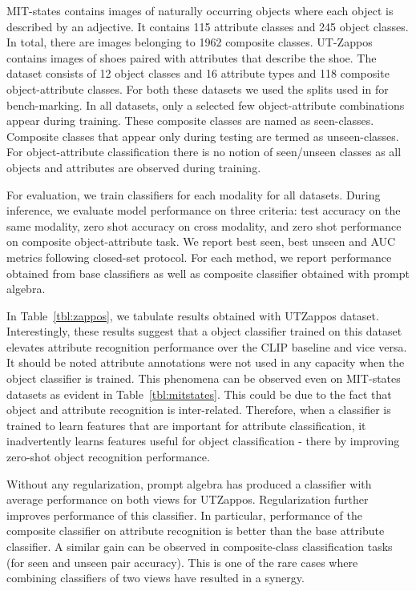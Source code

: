 \documentclass[10pt,twocolumn,letterpaper]{article}
\begin{document}
MIT-states contains images of naturally occurring objects where each object is described by an adjective. It contains 115 attribute classes and 245 object classes. In total, there are images belonging to 1962 composite classes. UT-Zappos contains images of shoes paired with attributes that describe the shoe. The dataset consists of 12 object classes and 16 attribute types and 118 composite object-attribute classes.  For both these datasets we used the splits used in \cite{csp} for bench-marking. In all datasets, only a selected few object-attribute combinations appear during training. These composite classes are named as seen-classes. Composite classes that appear only during testing are termed as unseen-classes. For object-attribute classification there is no notion of seen/unseen classes as all objects and attributes are observed during training.


For evaluation, we train classifiers for each modality for all datasets. During inference, we evaluate model performance on three criteria: test accuracy on the same modality, zero shot accuracy on cross modality, and zero shot performance on composite object-attribute task. We report best seen, best unseen and AUC metrics  \cite{csp} following closed-set protocol. For each method, we report performance obtained from base classifiers as well as composite classifier obtained with prompt algebra. 


In Table~\ref{tbl:zappos}, we tabulate results obtained with UTZappos dataset. Interestingly, these results suggest that a object classifier trained on this dataset elevates attribute recognition performance over the CLIP baseline and vice versa. It should be noted attribute annotations were not used in any capacity when the object classifier is trained.  This phenomena can be observed even on MIT-states datasets as evident in Table~\ref{tbl:mitstates}. This could be due to the fact that object and attribute recognition is inter-related. Therefore, when a classifier is trained to learn features that are important for attribute classification, it  inadvertently learns features useful for object classification - there by improving zero-shot object recognition performance. 

Without any regularization, prompt algebra has produced a classifier with average performance on both views for UTZappos. Regularization further improves performance of this classifier. In particular, performance of the composite classifier on attribute recognition is better than the base attribute classifier. A similar gain can be observed in composite-class classification tasks (for seen and unseen pair accuracy). This is one of the rare cases where combining  classifiers of two views have resulted in a synergy. 
\end{document}

